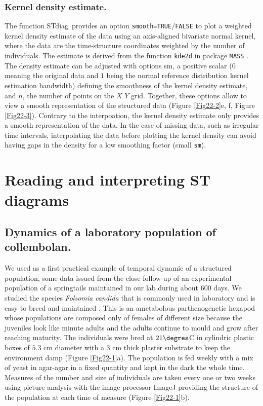 \subsubsection{Kernel density estimate.}
The function STdiag~provides an option \texttt{smooth=TRUE}$/$\texttt{FALSE} to
plot a weighted kernel density estimate of the data using an axis-aligned bivariate normal
kernel, where the data are the time-structure coordinates weighted by the number
of individuals. The estimate is derived from the function \texttt{kde2d} in
package \texttt{MASS} \autocites{venables2002a}. The density estimate can be
adjusted with options sm, a positive scalar ($0$ meaning the original data and $1$ being
the normal reference distribution kernel estimation bandwidth) defining the smoothness of
the kernel density estimate, and $n$, the number of points on the $X$ $Y$ grid.
Together, these options allow to view a smooth representation of the structured
data (Figure \ref{Fig22-2}e, f, Figure \ref{Fig22-3}). Contrary to the interpoation, the kernel density
estimate only provides a smooth representation of the data. In the case of
missing data, such as irregular time intervals, interpolating the data before
plotting the kernel density can avoid having gaps in the density for a low
smoothing factor (small \texttt{sm}).

\section{Reading and interpreting ST diagrams}

\subsection{Dynamics of a laboratory population of collembolan.}
We used as a first practical example of temporal dynamic of a structured
population, some data issued from the close follow-up of an experimental
population of a springtails maintained in our lab during about $600$ days. We
studied the species \textit{Folsomia candida} that is commonly used in laboratory and is
easy to breed and maintained \autocites{fountain2005a}. This is
an ametabolous parthenogenetic hexapod whose populations are composed only of females of
different size because the juveniles look like minute adults and the adults
continue to mould and grow after reaching maturity. The individuals were bred at
$21 \degres$C in cylindric plastic boxes of $5.3$ cm diameter with a $3$ cm thick
plaster substrate to keep the environment damp \autocites{tully2008a} (Figure
\ref{Fig22-1}a). The population is fed weekly with a mix of yeast in agar-agar in a fixed quantity
and kept in the dark the whole time. Measures of the number and size of
individuals are taken every one or two weeks using picture analysis with the
image processor ImageJ \autocites{abramoff2004a,mallard2012a,mallard2013a}
providing the structure of the population at each time of measure (Figure \ref{Fig22-1}b).


